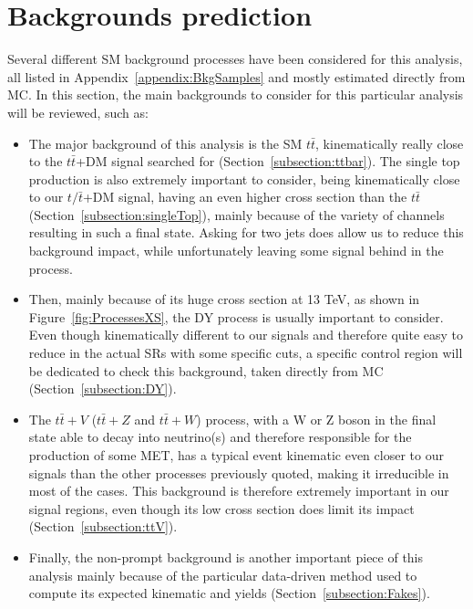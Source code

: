 \documentclass[a4paper, 10pt, openright]{report}
\begin{document}
\section{Backgrounds prediction} \label{section:Backgrounds}

Several different \ac{SM} background processes have been considered for this analysis, all listed in Appendix~\ref{appendix:BkgSamples} and mostly estimated directly from \ac{MC}. In this section, the main backgrounds to consider for this particular analysis will be reviewed, such as:

\begin{itemize}
\item The major background of this analysis is the \ac{SM} $t \bar t$, kinematically really close to the $t \bar t$+DM signal searched for (Section~\ref{subsection:ttbar}). The single top production is also extremely important to consider, being kinematically close to our $t/\bar t$+DM signal, having an even higher cross section than the $t \bar t$ (Section~\ref{subsection:singleTop}), mainly because of the variety of channels resulting in such a final state. Asking for two jets does allow us to reduce this background impact, while unfortunately leaving some signal behind in the process.
\item Then, mainly because of its huge cross section at 13 TeV, as shown in Figure~\ref{fig:ProcessesXS}, the \ac{DY} process is usually important to consider. Even though kinematically different to our signals and therefore quite easy to reduce in the actual \acp{SR} with some specific cuts, a specific control region will be dedicated to check this background, taken directly from \ac{MC} (Section~\ref{subsection:DY}).
\item The $t \bar t + V$ ($t \bar t + Z$ and $t \bar t + W$) process, with a W or Z boson in the final state able to decay into neutrino(s) and therefore responsible for the production of some \ac{MET}, has a typical event kinematic even closer to our signals than the other processes previously quoted, making it irreducible in most of the cases. This background is therefore extremely important in our signal regions, even though its low cross section does limit its impact (Section~\ref{subsection:ttV}).
\item Finally, the non-prompt background is another important piece of this analysis mainly because of the particular data-driven method used to compute its expected kinematic and yields (Section~\ref{subsection:Fakes}).
\end{itemize}
\end{document}
